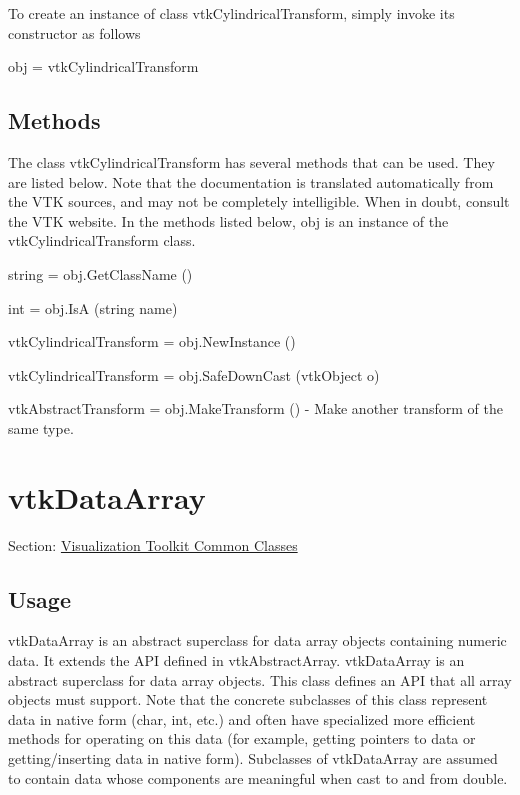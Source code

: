 To create an instance of class vtk\-Cylindrical\-Transform, simply invoke its constructor as follows \begin{DoxyVerb}  obj = vtkCylindricalTransform
\end{DoxyVerb}
 \hypertarget{vtkwidgets_vtkxyplotwidget_Methods}{}\subsection{Methods}\label{vtkwidgets_vtkxyplotwidget_Methods}
The class vtk\-Cylindrical\-Transform has several methods that can be used. They are listed below. Note that the documentation is translated automatically from the V\-T\-K sources, and may not be completely intelligible. When in doubt, consult the V\-T\-K website. In the methods listed below, {\ttfamily obj} is an instance of the vtk\-Cylindrical\-Transform class. 
\begin{DoxyItemize}
\item {\ttfamily string = obj.\-Get\-Class\-Name ()}  
\item {\ttfamily int = obj.\-Is\-A (string name)}  
\item {\ttfamily vtk\-Cylindrical\-Transform = obj.\-New\-Instance ()}  
\item {\ttfamily vtk\-Cylindrical\-Transform = obj.\-Safe\-Down\-Cast (vtk\-Object o)}  
\item {\ttfamily vtk\-Abstract\-Transform = obj.\-Make\-Transform ()} -\/ Make another transform of the same type.  
\end{DoxyItemize}\hypertarget{vtkcommon_vtkdataarray}{}\section{vtk\-Data\-Array}\label{vtkcommon_vtkdataarray}
Section\-: \hyperlink{sec_vtkcommon}{Visualization Toolkit Common Classes} \hypertarget{vtkwidgets_vtkxyplotwidget_Usage}{}\subsection{Usage}\label{vtkwidgets_vtkxyplotwidget_Usage}
vtk\-Data\-Array is an abstract superclass for data array objects containing numeric data. It extends the A\-P\-I defined in vtk\-Abstract\-Array. vtk\-Data\-Array is an abstract superclass for data array objects. This class defines an A\-P\-I that all array objects must support. Note that the concrete subclasses of this class represent data in native form (char, int, etc.) and often have specialized more efficient methods for operating on this data (for example, getting pointers to data or getting/inserting data in native form). Subclasses of vtk\-Data\-Array are assumed to contain data whose components are meaningful when cast to and from double.

